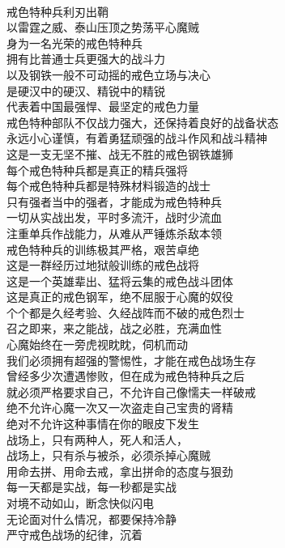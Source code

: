 \begin{poem}[中国戒色力量]
    \begin{multicols}{2}
        \begin{center}~\\
            戒色特种兵利刃出鞘 \\ 以雷霆之威、泰山压顶之势荡平心魔贼 \\ 身为一名光荣的戒色特种兵 \\ 拥有比普通士兵更强大的战斗力 \\ 以及钢铁一般不可动摇的戒色立场与决心 \\ 是硬汉中的硬汉、精锐中的精锐 \\ 代表着中国最强悍、最坚定的戒色力量 \\ 戒色特种部队不仅战力强大，还保持着良好的战备状态 \\ 永远小心谨慎，有着勇猛顽强的战斗作风和战斗精神 \\ 这是一支无坚不摧、战无不胜的戒色钢铁雄狮 \\ 每个戒色特种兵都是真正的精兵强将 \\ 每个戒色特种兵都是特殊材料锻造的战士 \\ 只有强者当中的强者，才能成为戒色特种兵 \\ 一切从实战出发，平时多流汗，战时少流血 \\ 注重单兵作战能力，从难从严锤炼杀敌本领 \\ 戒色特种兵的训练极其严格，艰苦卓绝 \\ 这是一群经历过地狱般训练的戒色战将 \\ 这是一个英雄辈出、猛将云集的戒色战斗团体 \\ 这是真正的戒色钢军，绝不屈服于心魔的奴役 \\ 个个都是久经考验、久经战阵而不破的戒色烈士 \\ 召之即来，来之能战，战之必胜，充满血性 \\ 心魔始终在一旁虎视眈眈，伺机而动 \\ 我们必须拥有超强的警惕性，才能在戒色战场生存 \\ 曾经多少次遭遇惨败，但在成为戒色特种兵之后 \\ 就必须严格要求自己，不允许自己像懦夫一样破戒 \\ 绝不允许心魔一次又一次盗走自己宝贵的肾精 \\ 绝对不允许这种事情在你的眼皮下发生 \\ 战场上，只有两种人，死人和活人， \\ 战场上，只有杀与被杀，必须杀掉心魔贼 \\ 用命去拼、用命去戒，拿出拼命的态度与狠劲 \\ 每一天都是实战，每一秒都是实战 \\ 对境不动如山，断念快似闪电 \\ 无论面对什么情况，都要保持冷静 \\ 严守戒色战场的纪律，沉着
\end{center}
\end{multicols}
\end{poem}
